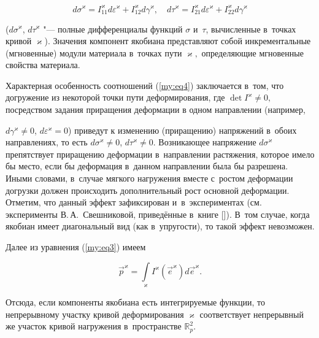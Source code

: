 \begin{equation}

\label{my:eq4}

d \sigma^\varkappa=I_{11}^\varkappa d \varepsilon^\varkappa+I_{12}^\varkappa d \gamma^\varkappa,\quad  

d \tau^\varkappa=I_{21}^\varkappa d \varepsilon^\varkappa+I_{22}^\varkappa d \gamma^\varkappa

\end{equation}

($d \sigma^\varkappa$, $d \tau^\varkappa$ "--- полные дифференциалы функций $\sigma$ и~$\tau$, вычисленные в~точках кривой $\varkappa$). Значения компонент якобиана представляют собой инкрементальные (мгновенные) модули материала в~точках пути $\varkappa,$ определяющие мгновенные свойства материала.



Характерная особенность соотношений (\ref{my:eq4}) заключается в~том, что догружение из некоторой точки пути деформирования, где $\det I^\varkappa\neq0,$ посредством задания приращения деформации в одном направлении (например, 

$d \gamma^\varkappa\neq0$, $d\varepsilon^\varkappa=0$) приведут к изменению (приращению) напряжений в~обоих направлениях, то есть $d \sigma^\varkappa\neq0$, $d \tau^\varkappa\neq0.$ Возникающее напряжение $d \sigma^\varkappa$ препятствует приращению деформации в~направлении растяжения, которое имело бы место, если бы деформация в~данном направлении была бы разрешена. Иными словами, в~случае мягкого нагружения вместе с~ростом деформации догрузки должен происходить дополнительный рост основной деформации. Отметим, что данный эффект зафиксирован и~в~экспериментах (см. эксперименты В.\,А.~Свешниковой, приведённые в~книге []). В~том случае, когда якобиан имеет диагональный вид (как в~упругости), то такой эффект невозможен.



Далее из уравнения (\ref{my:eq3}) имеем

$$

\overrightarrow{p}^\varkappa=\int\limits_{\varkappa} I^\varkappa(\overrightarrow{e}^\varkappa) d \overrightarrow{e}^\varkappa.

$$

Отсюда, если компоненты якобиана есть интегрируемые функции, то непрерывному участку кривой деформирования $\varkappa$ соответствует непрерывный же участок кривой нагружения в~пространстве $\mathbb R^2_{p}.$



